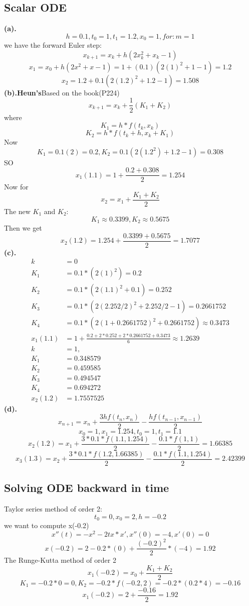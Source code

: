 \subsection{Scalar ODE}
\textbf{(a).}
\[h=0.1,t_0=1,t_1=1.2,x_0=1,for:m=1
\]we have the forward Euler step:
\[x_{k+1}=x_k+h(2x_k^2+x_k-1)\]
\[x_1=x_0+h(2x^2+x-1)=1+(0.1)(2(1)^2+1-1)=1.2\]
\[x_2=1.2+0.1(2(1.2)^2+1.2-1)=1.508\]
\textbf{(b).Heun's}Based on the book(P224)
\[x_{k+1}=x_k+\frac{1}{2}(K_1+K_2)\]
where
\[K_1=h*f(t_k,x_k)\]\[K_2=h*f(t_k+h,x_k+K_1)\]
Now\[K_1=0.1(2)=0.2,K_2=0.1(2(1.2^2)+1.2-1)=0.308\]SO
\[x_1(1.1)=1+\frac{0.2+0.308}{2}=1.254\]
Now for\[x_2=x_1+\frac{K_1+K_2}{2}\]
The new $K_1$ and $K_2$:
\[K_1\approx0.3399, K_2\approx0.5675\]Then we get 
\[x_2(1.2)=1.254+\frac{0.3399+0.5675}{2}=1.7077\]
\textbf{(c).}
\begin{align*}
    k&=0\\
    K_1&=0.1*(2(1)^2)=0.2\\
    K_2&=0.1*(2(1.1)^2+0.1)=0.252\\
    K_3&=0.1*(2(2.252/2)^2+2.252/2-1)=0.2661752\\
    K_4&=0.1*(2(1+0.2661752)^2+0.2661752)\approx0.3473\\
    x_1(1.1)&=1+\frac{0.2+2*0.252+2*0.2661752+0.3473}{6}\approx1.2639\\
    k&=1,\\
    K_1&=0.348579\\
    K_2&=0.459585\\
    K_3&=0.494547\\
    K_4&=0.694272\\
    x_2(1.2)&=1.7557525
\end{align*}
\textbf{(d).}
\[x_{n+1}=x_n+\frac{3hf(t_n,x_n)}{2}-\frac{hf(t_{n-1},x_{n-1})}{2}\]
\[x_0=1,x_1=1.254,t_0=1,t_1=1.1\]
\[x_2(1.2)=x_1+\frac{3*0.1*f(1.1,1.254)}{2}-\frac{0.1*f(1,1)}{2}=1.66385\]
\[x_3(1.3)=x_2+\frac{3*0.1*f(1.2,1.66385)}{2}-\frac{0.1*f(1.1,1.254)}{2}=2.42399\]
\newpage
\subsection{Solving ODE backward in time}
Taylor series method of order 2:
\[t_0=0,x_0=2,h=-0.2\] we want to compute x(-0.2)
\[x''(t)=-x^2-2tx*x',x''(0)=-4,x'(0)=0\]
\[x(-0.2)=2-0.2*(0)+\frac{(-0.2)^2}{2}*(-4)=1.92\]
The Runge-Kutta method of order 2
\[x_1(-0.2)=x_0+\frac{K_1+K_2}{2}\]
\[K_1=-0.2*0=0,K_2=-0.2*f(-0.2,2)=-0.2*(0.2*4)=-0.16\]
\[x_1(-0.2)=2+\frac{-0.16}{2}=1.92\]
\newpage
